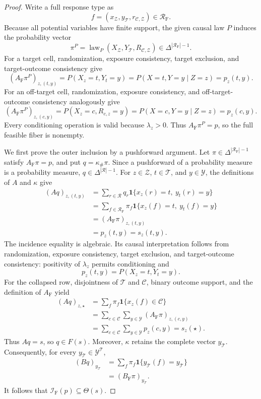 \documentclass{article}
\begin{document}
\begin{proof}
Write a full response type as
\[
f=(x_{\mathcal Z},y_{\mathcal T},r_{\mathcal C,\mathcal Z})
\in\mathcal R_{\mathrm F}.
\]
Because all potential variables have finite support, the given causal law \(P\) induces the probability vector
\[
\pi^P=\operatorname{law}_P(X_{\mathcal Z},Y_{\mathcal T},R_{\mathcal C,\mathcal Z})
\in\Delta^{|\mathcal R_{\mathrm F}|-1}.
\]
For a target cell, randomization, exposure consistency, target exclusion, and target-outcome consistency give
\[
(A_{\mathrm F}\pi^P)_{z,(t,y)}
=P(X_z=t,Y_t=y)
=P(X=t,Y=y\mid Z=z)
=p_z(t,y).
\]
For an off-target cell, randomization, exposure consistency, and off-target-outcome consistency analogously give
\[
(A_{\mathrm F}\pi^P)_{z,(c,y)}
=P(X_z=c,R_{c,z}=y)
=P(X=c,Y=y\mid Z=z)
=p_z(c,y).
\]
Every conditioning operation is valid because \(\lambda_z>0\).  Thus \(A_{\mathrm F}\pi^P=p\), so the full feasible fiber is nonempty.

We first prove the outer inclusion by a pushforward argument.  Let \(\pi\in\Delta^{|\mathcal R_{\mathrm F}|-1}\) satisfy \(A_{\mathrm F}\pi=p\), and put \(q=\kappa_{\#}\pi\).  Since a pushforward of a probability measure is a probability measure, \(q\in\Delta^{|\mathcal R|-1}\).  For \(z\in\mathcal Z\), \(t\in\mathcal T\), and \(y\in\mathcal Y\), the definitions of \(A\) and \(\kappa\) give
\[
\begin{aligned}
(Aq)_{z,(t,y)}
&=\sum_{r\in\mathcal R}q_r
  \mathbf 1\{x_z(r)=t,\ y_t(r)=y\}\\
&=\sum_{f\in\mathcal R_{\mathrm F}}\pi_f
  \mathbf 1\{x_z(f)=t,\ y_t(f)=y\}\\
&=(A_{\mathrm F}\pi)_{z,(t,y)}\\
&=p_z(t,y)=s_z(t,y).
\end{aligned}
\]
The incidence equality is algebraic.  Its causal interpretation follows from randomization, exposure consistency, target exclusion, and target-outcome consistency: positivity of \(\lambda_z\) permits conditioning and
\[
p_z(t,y)=P(X_z=t,Y_t=y).
\]
For the collapsed row, disjointness of \(\mathcal T\) and \(\mathcal C\), binary outcome support, and the definition of \(A_{\mathrm F}\) yield
\[
\begin{aligned}
(Aq)_{z,\star}
&=\sum_f\pi_f\mathbf 1\{x_z(f)\in\mathcal C\}\\
&=\sum_{c\in\mathcal C}\sum_{y\in\mathcal Y}
  (A_{\mathrm F}\pi)_{z,(c,y)}\\
&=\sum_{c\in\mathcal C}\sum_{y\in\mathcal Y}p_z(c,y)
=s_z(\star).
\end{aligned}
\]
Thus \(Aq=s\), so \(q\in F(s)\).  Moreover, \(\kappa\) retains the complete vector \(y_{\mathcal T}\).  Consequently, for every \(y_{\mathcal T}\in\mathcal Y^{\mathcal T}\),
\[
\begin{aligned}
(Bq)_{y_{\mathcal T}}
&=\sum_f\pi_f\mathbf 1\{y_{\mathcal T}(f)=y_{\mathcal T}\}\\
&=(B_{\mathrm F}\pi)_{y_{\mathcal T}}.
\end{aligned}
\]
It follows that \(\mathcal I_{\mathrm F}(p)\subseteq\Theta(s)\).


\end{proof}
\end{document}
